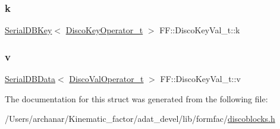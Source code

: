 \subsubsection{\texorpdfstring{k}{k}}
{\footnotesize\ttfamily \mbox{\hyperlink{classADATIO_1_1SerialDBKey}{Serial\+D\+B\+Key}}$<$ \mbox{\hyperlink{structFF_1_1DiscoKeyOperator__t}{Disco\+Key\+Operator\+\_\+t}} $>$ F\+F\+::\+Disco\+Key\+Val\+\_\+t\+::k}

\mbox{\label{structFF_1_1DiscoKeyVal__t_ae0d9c7724d26fd2b0c5118b65651b443}} 
\subsubsection{\texorpdfstring{v}{v}}
{\footnotesize\ttfamily \mbox{\hyperlink{classADATIO_1_1SerialDBData}{Serial\+D\+B\+Data}}$<$ \mbox{\hyperlink{classFF_1_1DiscoValOperator__t}{Disco\+Val\+Operator\+\_\+t}} $>$ F\+F\+::\+Disco\+Key\+Val\+\_\+t\+::v}



The documentation for this struct was generated from the following file\+:\begin{DoxyCompactItemize}
\item 
/\+Users/archanar/\+Kinematic\+\_\+factor/adat\+\_\+devel/lib/formfac/\mbox{\hyperlink{lib_2formfac_2discoblocks_8h}{discoblocks.\+h}}\end{DoxyCompactItemize}

